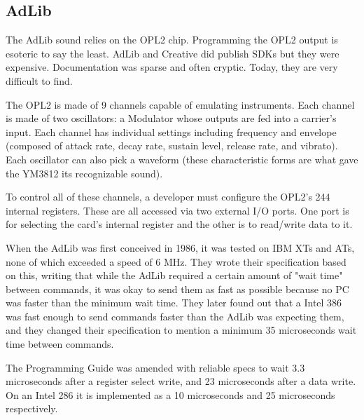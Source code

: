 \documentclass[book.tex]{subfiles}
\begin{document}
\subsection{AdLib}
The AdLib sound relies on the OPL2 chip. Programming the OPL2 output is esoteric to say the least. AdLib and Creative did publish SDKs but they were expensive.  Documentation was sparse and often cryptic. Today, they are very difficult to find.\\
\par
The OPL2 is made of 9 channels capable of emulating instruments. Each channel is made of two oscillators: a Modulator whose outputs are fed into a carrier's input. Each channel has individual settings including frequency and envelope (composed of attack rate, decay rate, sustain level, release rate, and vibrato). Each oscillator can also pick a waveform (these characteristic forms are what gave the YM3812 its recognizable sound).\\
\par
 To control all of these channels, a developer must configure the OPL2's 244 internal registers. These are all accessed via two external I/O ports. One port is for selecting the card's internal register and the other is to read/write data to it.\\
\par
\begin{minipage}{\textwidth}

\end{minipage}
\par
When the AdLib was first conceived in 1986, it was tested on IBM XTs and ATs, none of which exceeded a speed of 6 MHz. They wrote their specification based on this, writing that while the AdLib required a certain amount of "wait time" between commands, it was okay to send them as fast as possible because no PC was faster than the minimum wait time. They later found out that a Intel 386 was fast enough to send commands faster than the AdLib was expecting them, and they changed their specification to mention a minimum 35 microseconds wait time between commands.\\

\par
The Programming Guide was amended with reliable specs to wait 3.3 microseconds after a register select write, and 23 microseconds after a data write. On an Intel 286 it is implemented as a 10 microseconds and 25 microseconds respectively.\\
\end{document}
